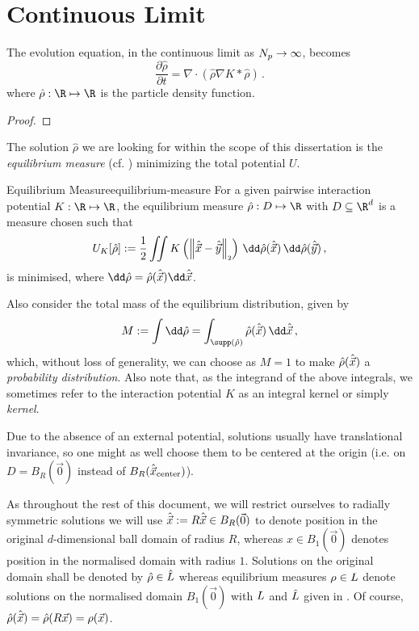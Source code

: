 \section{Continuous Limit}
The evolution equation, in the continuous limit as $N_p \rightarrow \infty$, becomes
\begin{equation}
  \frac{\partial \hat{\rho}}{\partial t} = \nabla \cdot \left(\hat{\rho} \nabla K * \hat{\rho}\right)\,.
  \label{eq:continuous-evolution-equation}
\end{equation}
where $\hat{\rho}: \R \mapsto \R$ is the particle density function.
\begin{proof}
  \hierKoennteIhreWerbungStehen
\end{proof}
The solution $\hat{\rho}$ we are looking for within the scope of this dissertation is the \textit{equilibrium measure} (cf. ) minimizing the total potential $U$.

\begin{definition}{Equilibrium Measure}{equilibrium-measure}
  For a given pairwise interaction potential $K: \R \mapsto \R$, the equilibrium measure $\hat{\rho}: D \mapsto \R$ with $D \subseteq \R^d$ is a measure chosen such that
  $$U_K[\hat{\rho}] := \frac{1}{2} \iint K\left(\norm{\hatvec{x} - \hatvec{y}}\right) \,\dd\hat{\rho}(\hatvec{x})\,\dd\hat{\rho}(\hatvec{y})\,,$$
  is minimised, where $\dd\hat{\rho} = \hat{\rho}(\hatvec{x})\dd\hatvec{x}$.
\end{definition}
Also consider the total mass of the equilibrium distribution, given by
\begin{equation}
  M := \int \dd\hat{\rho} = \int_{\supp(\hat{\rho})} \hat{\rho}(\hatvec{x}) \,\dd\hatvec{x}\,,
  \label{eq:measure-mass}
\end{equation}
which, without loss of generality, we can choose as $M = 1$ to make $\hat{\rho}(\hat{\vec{x}})$ a \textit{probability distribution}.
Also note that, as the integrand of the above integrals, we sometimes refer to the interaction potential $K$ as an integral kernel or simply \textit{kernel}.

Due to the absence of an external potential, solutions usually have translational invariance, so one might as well choose them to be centered at the origin (i.e. on $D = B_R(\vec{0})$ instead of $B_R(\hat{\vec{x}}_{\text{center}})$).

As throughout the rest of this document, we will restrict ourselves to radially symmetric solutions we will use $\hat{\vec{x}} := R\hat{\vec{x}} \in B_R(\vec{0})$ to denote position in the original $d$-dimensional ball domain of radius $R$, whereas $x \in B_1(\vec{0})$ denotes position in the normalised domain with radius $1$.
Solutions on the original domain shall be denoted by $\hat{\rho} \in \hat{L}$ whereas equilibrium measures $\rho \in L$ denote solutions on the normalised domain $B_1(\vec{0})$ with $L$ and $\hat{L}$ given in .
Of course, $\hat{\rho}(\hat{\vec{x}}) = \hat{\rho}(R\vec{x}) = \rho(\vec{x})$.


